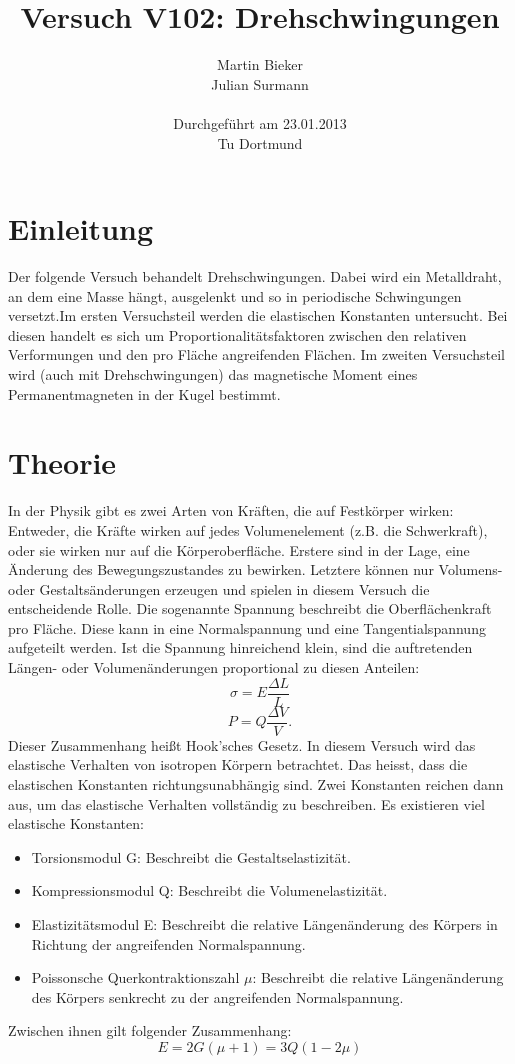 \documentclass[11pt,ngerman,a4paper]{article}
\title{\textbf{Versuch V102: Drehschwingungen}}
\author{Martin Bieker\\
		Julian Surmann\\
		\\
		Durchgef\"{u}hrt am 23.01.2013\\
		Tu Dortmund}
\date{}
\begin{document}
\renewcommand\tablename{Tabelle}
\renewcommand\figurename{Abbildung}
\maketitle
\thispagestyle{empty}
\newpage
\clearpage
\setcounter{page}{1}

\section{Einleitung}
Der folgende Versuch behandelt Drehschwingungen. Dabei wird ein Metalldraht, an dem eine Masse hängt, ausgelenkt und so in periodische Schwingungen versetzt.Im ersten Versuchsteil werden die elastischen Konstanten untersucht. Bei diesen handelt es sich um Proportionalitätsfaktoren zwischen den relativen Verformungen und den pro Fläche angreifenden Flächen.
Im zweiten Versuchsteil wird (auch mit Drehschwingungen) das magnetische Moment eines Permanentmagneten in der Kugel bestimmt.
\section{Theorie}
In der Physik gibt es zwei Arten von Kräften, die auf Festkörper wirken: Entweder, die Kräfte wirken auf jedes Volumenelement (z.B. die Schwerkraft), oder sie wirken nur auf die Körperoberfläche. Erstere sind in der Lage, eine Änderung des Bewegungszustandes zu bewirken. Letztere können nur Volumens- oder Gestaltsänderungen erzeugen und spielen in diesem Versuch die entscheidende Rolle. Die sogenannte Spannung beschreibt die Oberflächenkraft pro Fläche. Diese kann in eine Normalspannung und eine Tangentialspannung aufgeteilt werden. Ist die Spannung hinreichend klein, sind die auftretenden Längen- oder Volumenänderungen proportional zu diesen Anteilen:
\begin{equation}
\label{1}
\sigma = E\frac{\Delta L}{L}
\end{equation}
\begin{equation}
\label{2}
P = Q\frac{\Delta V}{V}.
\end{equation}
Dieser Zusammenhang heißt Hook'sches Gesetz.\newline
In diesem Versuch wird das elastische Verhalten von isotropen Körpern betrachtet. Das heisst, dass die elastischen Konstanten richtungsunabhängig sind. Zwei Konstanten reichen dann aus, um das elastische Verhalten vollständig zu beschreiben. Es existieren viel elastische Konstanten:
\begin{itemize}
\item Torsionsmodul G: Beschreibt die Gestaltselastizität.
\item Kompressionsmodul Q: Beschreibt die Volumenelastizität.
\item Elastizitätsmodul E: Beschreibt die relative Längenänderung des Körpers in Richtung der angreifenden Normalspannung.
\item Poissonsche Querkontraktionszahl $\mu$: Beschreibt die relative Längenänderung des Körpers senkrecht zu der angreifenden Normalspannung.
\end{itemize}
Zwischen ihnen gilt folgender Zusammenhang:
\begin{equation}
E = 2G(\mu+1)=3Q(1-2\mu)
\label{3}
\end{equation}
\end{document}

